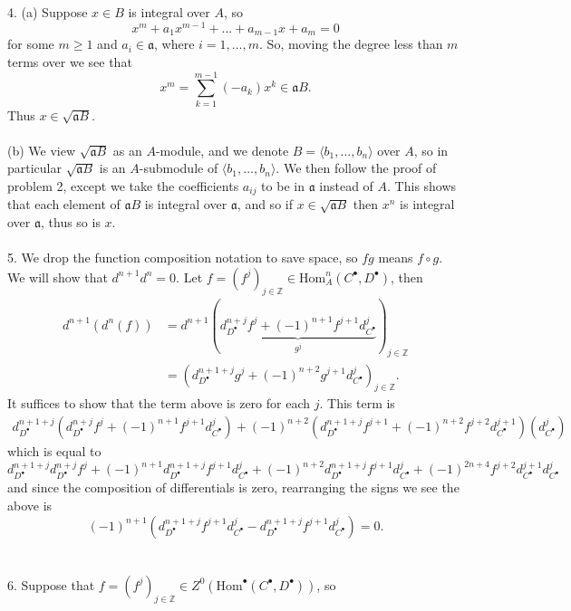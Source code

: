\documentclass{article}
\newcommand{\Z}{\mathbb{Z}}
\newcommand{\Hom}{\text{Hom}}
\begin{document}
\\ \\
4. (a) Suppose $x \in B$ is integral over $A$, so 
\[
x^m + a_1x^{m-1} + ... + a_{m-1}x + a_m = 0
\]
for some $m \geq 1$ and $a_i \in \mathfrak{a}$, where $i=1,...,m$. So, moving the degree less than $m$ terms over we see that
\[
x^m = \sum_{k=1}^{m-1} (-a_k)x^k \in \mathfrak{a}B.
\]
Thus $x \in \sqrt{\mathfrak{a}B}$. 
\\ \\
(b) We view $\sqrt{\mathfrak{a}B}$ as an $A$-module, and we denote $B = \langle b_1, ..., b_n \rangle$ over $A$, so in particular $\sqrt{\mathfrak{a}B}$ is an $A$-submodule of $\langle b_1,...,b_n\rangle$. We then follow the proof of problem 2, except we take the coefficients $a_{ij}$ to be in $\mathfrak{a}$ instead of $A$. This shows that each element of $\mathfrak{a}B$ is integral over $\mathfrak{a}$, and so if $x \in \sqrt{\mathfrak{a}B}$ then $x^n$ is integral over $\mathfrak{a}$, thus so is $x$.
\\ \\
5. We drop the function composition notation to save space, so $fg$ means $f \circ g$. We will show that $d^{n+1} d^n = 0$. Let $f = (f^j)_{j\in \Z} \in \Hom^n_A(C^{\bullet}, D^{\bullet})$, then
\begin{align*}
    d^{n+1}(d^n (f)) &= d^{n+1}( \underbrace{d_{D^{\bullet}}^{n+j} f^j +(-1)^{n+1} f^{j+1} d_{C^{\bullet}}^j }_{g^j})_{j\in \Z} \\
    &= (d_{D^{\bullet}}^{n+1+j}  g^j + (-1)^{n+2} g^{j+1}  d_{C^{\bullet}}^j)_{j\in \Z}.
\end{align*}
It suffices to show that the term above is zero for each $j$. This term is
\begin{align*}
    d_{D^{\bullet}}^{n+1+j} (d_{D^{\bullet}}^{n+j}  f^j + (-1)^{n+1} f^{j+1}  d_{C^{\bullet}}^j) + (-1)^{n+2}(d_{D^{\bullet}}^{n+1+j}  f^{j+1} +(-1)^{n+2} f^{j+2}  d_{C^{\bullet}}^{j+1})(d_{C^{\bullet}}^j)
\end{align*}
which is equal to
\[
d_{D^{\bullet}}^{n+1+j} d_{D^{\bullet}}^{n+j} f^j + (-1)^{n+1} d_{D^{\bullet}}^{n+1+j} f^{j+1} d_{C^{\bullet}}^j + (-1)^{n+2} d_{D^{\bullet}}^{n+1+j}f^{j+1}d_{C^{\bullet}}^j +(-1)^{2n+4} f^{j+2}d_{C^{\bullet}}^{j+1} d_{C^{\bullet}}^j
\]
and since the composition of differentials is zero, rearranging the signs we see the above is 
\[
(-1)^{n+1}(d_{D^{\bullet}}^{n+1+j}f^{j+1}d_{C^{\bullet}}^j - d_{D^{\bullet}}^{n+1+j}f^{j+1}d_{C^{\bullet}}^j) = 0.
\]
\\ \\
6. Suppose that $f = (f^j)_{j\in \Z} \in Z^0(\Hom^{\bullet}(C^{\bullet}, D^{\bullet}))$, so 
\end{document}
